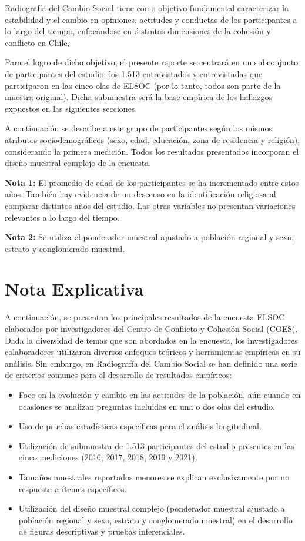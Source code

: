 \documentclass[
  12pt,
  openany]{book}
\providecommand{\tightlist}{%
  \setlength{\itemsep}{0pt}\setlength{\parskip}{0pt}}
\begin{document}
Radiografía del Cambio Social tiene como objetivo fundamental caracterizar la estabilidad y el cambio en opiniones, actitudes y conductas de los participantes a lo largo del tiempo, enfocándose en distintas dimensiones de la cohesión y conflicto en Chile.

Para el logro de dicho objetivo, el presente reporte se centrará en un subconjunto de participantes del estudio: los 1.513 entrevistados y entrevistadas que participaron en las cinco olas de ELSOC (por lo tanto, todos son parte de la muestra original). Dicha submuestra será la base empírica de los hallazgos expuestos en las siguientes secciones.

A continuación se describe a este grupo de participantes según los mismos atributos sociodemográficos (sexo, edad, educación, zona de residencia y religión), considerando la primera medición. Todos los resultados presentados incorporan el diseño muestral complejo de la encuesta.

\textbf{Nota 1:} El promedio de edad de los participantes se ha incrementado entre estos años. También hay evidencia de un descenso en la identificación religiosa al comparar distintos años del estudio. Las otras variables no presentan variaciones relevantes a lo largo del tiempo.

\textbf{Nota 2:} Se utiliza el ponderador muestral ajustado a población regional y sexo, estrato y conglomerado muestral.

\hypertarget{nota-explicativa}{%
\section{Nota Explicativa}\label{nota-explicativa}}

A continuación, se presentan los principales resultados de la encuesta ELSOC elaborados por investigadores del Centro de Conflicto y Cohesión Social (COES). Dada la diversidad de temas que son abordados en la encuesta, los investigadores colaboradores utilizaron diversos enfoques teóricos y herramientas empíricas en su análisis. Sin embargo, en Radiografía del Cambio Social se han definido una serie de criterios comunes para el desarrollo de resultados empíricos:

\begin{itemize}
\tightlist
\item
  Foco en la evolución y cambio en las actitudes de la población, aún cuando en ocasiones se analizan preguntas incluidas en una o dos olas del estudio.
\item
  Uso de pruebas estadísticas específicas para el análisis longitudinal.
\item
  Utilización de submuestra de 1.513 participantes del estudio presentes en las cinco mediciones (2016, 2017, 2018, 2019 y 2021).
\item
  Tamaños muestrales reportados menores se explican exclusivamente por no respuesta a ítemes específicos.
\item
  Utilización del diseño muestral complejo (ponderador muestral ajustado a población regional y sexo, estrato y conglomerado muestral) en el desarrollo de figuras descriptivas y pruebas inferenciales.
\end{itemize}
\end{document}
